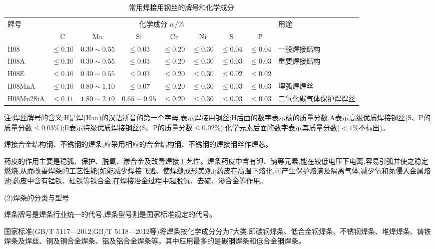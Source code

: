 \documentclass[UTF8]{ctexbook}
\newcommand{\◎}{\ensuremath{\bigcirc}}
\begin{document}
\begin{table}[H]
\centering
\caption{常用焊接用钢丝的牌号和化学成分}
\label{tab:9-1}
\small
\begin{tabular}{|l|c|c|c|c|c|c|c|l|}
\hline
\multirow{2}{*}{牌号} & \multicolumn{7}{c|}{化学成分 $w/\%$} & \multirow{2}{*}{用途} \\
\cline{2-8}
 & C & Mn & Si & Cr & Ni & S & P & \\
\hline
H08 & $\leqslant 0.10$ & $0.30 \sim 0.55$ & $\leqslant 0.03$ & $\leqslant 0.20$ & $\leqslant 0.30$ & $\leqslant 0.04$ & $\leqslant 0.04$ & 一般焊接结构 \\
\hline
H08A & $\leqslant 0.10$ & $0.30 \sim 0.55$ & $\leqslant 0.03$ & $\leqslant 0.20$ & $\leqslant 0.30$ & $\leqslant 0.03$ & $\leqslant 0.03$ & \multirow{2}{*}{重要焊接结构} \\
\cline{1-8}
H08E & $\leqslant 0.10$ & $0.30 \sim 0.55$ & $\leqslant 0.03$ & $\leqslant 0.20$ & $\leqslant 0.30$ & $\leqslant 0.02$ & $\leqslant 0.02$ & \\
\hline
H08MnA & $\leqslant 0.10$ & $0.80 \sim 1.10$ & $\leqslant 0.07$ & $\leqslant 0.20$ & $\leqslant 0.30$ & $\leqslant 0.03$ & $\leqslant 0.03$ & 埋弧焊焊丝 \\
\hline
H08Mn2SiA & $\leqslant 0.11$ & $1.80 \sim 2.10$ & $0.65 \sim 0.95$ & $\leqslant 0.20$ & $\leqslant 0.30$ & $\leqslant 0.03$ & $\leqslant 0.03$ & 二氧化碳气体保护焊焊丝 \\
\hline
\end{tabular}
\end{table}
注:焊丝牌号的含义:H是焊(Han)的汉语拼音的第一个字母,表示焊接用钢丝;H后面的数字表示碳的质量分数,A表示高级优质焊接钢丝(S、P的质量分数$\leqslant 0.03\%$);E表示特级优质焊接钢丝(S、P的质量分数$\leqslant 0.02\%$);化学元素后面的数字表示其质量分数($<1\%$不标出)。

焊接合金结构钢、不锈钢的焊条,应采用相应的合金结构钢、不锈钢的焊接钢丝作焊芯。

药皮的作用主要是稳弧、保护、脱氧、渗合金及改善焊接工艺性。焊条药皮中含有钾、钠等元素,能在较低电压下电离,容易引弧并使之稳定燃烧,从而改善焊条的工艺性能(如能减少焊接飞溅、使焊缝成形美观);药皮在高温下熔化,可产生保护熔渣及隔离气体,减少氧和氮侵入金属熔池;药皮中含有锰铁、硅铁等铁合金,在焊接冶金过程中起脱氧、去硫、渗合金等作用。

(2)焊条的分类与型号

焊条牌号是焊条行业统一的代号,焊条型号则是国家标准规定的代号。

国家标准(GB/T 5117—2012,GB/T 5118—2012等)将焊条按化学成分分为7大类,即碳钢焊条、低合金钢焊条、不锈钢焊条、堆焊焊条、铸铁焊条及焊丝、铜及铜合金焊条、铝及铝合金焊条等。其中应用最多的是碳钢焊条和低合金钢焊条。
\end{document}
